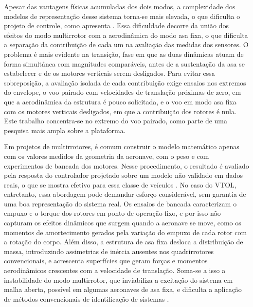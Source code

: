 Apesar das vantagens físicas acumuladas dos dois modos, a complexidade dos modelos de representação desse sistema torna-se mais elevada, o que dificulta o projeto de controle, como apresenta \textcite{Graesdal2021}. Essa dificuldade decorre da união dos efeitos do modo multirrotor com a aerodinâmica do modo asa fixa, o que {\color{blue}dificulta} a separação da contribuição de cada um na avaliação das medidas dos sensores. O problema é mais evidente na {\color{blue}transição, fase em que as duas dinâmicas atuam de forma simultânea com magnitudes comparáveis, antes de a sustentação da asa se estabelecer e de os motores verticais serem desligados. Para evitar essa sobreposição, a avaliação isolada de cada contribuição exige ensaios nos extremos do envelope, o voo pairado com velocidades de translação próximas de zero, em que a aerodinâmica da estrutura é pouco solicitada, e o voo em modo asa fixa com os motores verticais desligados, em que a contribuição dos rotores é nula. Este trabalho concentra-se no extremo do voo pairado, como parte de uma pesquisa mais ampla sobre a plataforma}.

Em projetos de multirrotores, é comum construir o modelo matemático apenas com os valores medidos da geometria da aeronave, com o peso e com experimentos de bancada dos motores. Nesse procedimento, o resultado é avaliado pela resposta do controlador projetado sobre um modelo não validado em dados reais, o que se mostra efetivo para essa classe de veículos \cite{Bouabdallah2007, Carino2015}. No caso do VTOL, entretanto, essa abordagem pode demandar esforço considerável, sem garantia de uma boa representação do sistema real{\color{blue}. Os ensaios de bancada caracterizam o empuxo e o torque dos rotores em ponto de operação fixo, e por isso não capturam os efeitos dinâmicos que surgem quando a aeronave se move, como os momentos de amortecimento gerados pela variação do empuxo de cada rotor com a rotação do corpo. Além disso, a estrutura de asa fixa desloca a distribuição de massa, introduzindo assimetrias de inércia ausentes nos quadrirrotores convencionais, e acrescenta superfícies que geram forças e momentos aerodinâmicos crescentes com a velocidade de translação.} Soma-se a isso a instabilidade do modo multirrotor, que inviabiliza a excitação do sistema em malha aberta, possível em algumas aeronaves de asa fixa, e dificulta a aplicação de métodos convencionais de identificação de sistemas \cite{Aguirre2015}.

